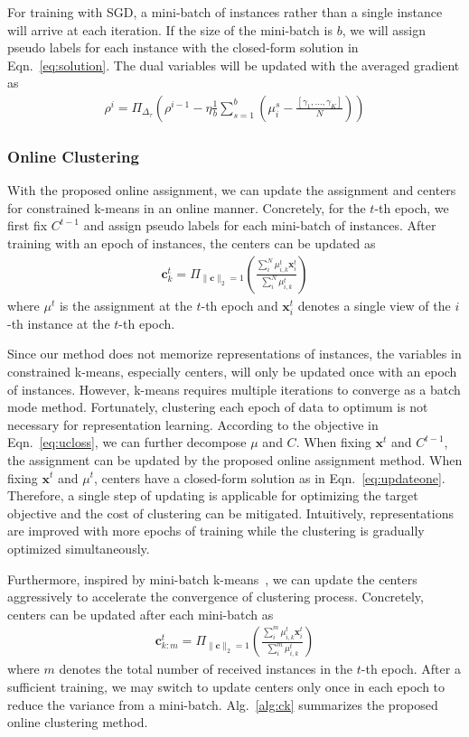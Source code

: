 \documentclass[10pt,twocolumn,letterpaper]{article}
\def \x {\mathbf{x}}
\def \cc {\mathbf{c}}
\begin{document}
For training with SGD, a mini-batch of instances rather than a single instance will arrive at each iteration. If the size of the mini-batch is $b$, we will assign pseudo labels for each instance with the closed-form solution in Eqn.~\ref{eq:solution}. The dual variables will be updated with the averaged gradient as
\begin{eqnarray}\label{eq:update}
\rho^i = \Pi_{\Delta_\tau}(\rho^{i-1} - \eta \frac{1}{b}\sum_{s=1}^b( \mu_{i}^s-\frac{[\gamma_1,\dots,\gamma_K]}{N}))
\end{eqnarray}

\subsubsection{Online Clustering}
With the proposed online assignment, we can update the assignment and centers for constrained k-means in an online manner. Concretely, for the $t$-th epoch, we first fix $C^{t-1}$ and assign pseudo labels for each mini-batch of instances. After training with an epoch of instances, the centers can be updated as
\begin{eqnarray}\label{eq:updateone}
\cc_k^t = \Pi_{\|\cc\|_2=1}(\frac{\sum_i^N\mu_{i,k}^t\x_i^t}{\sum_i^N \mu_{i,k}^t})
\end{eqnarray}
where $\mu^t$ is the assignment at the $t$-th epoch and $\x_i^t$ denotes a single view of the $i$-th instance at the $t$-th epoch.

Since our method does not memorize representations of instances, the variables in constrained k-means, especially centers, will only be updated once with an epoch of instances. However, k-means requires multiple iterations to converge as a batch mode method. Fortunately, clustering each epoch of data to optimum is not necessary for representation learning. According to the objective in Eqn.~\ref{eq:ucloss}, we can further decompose $\mu$ and $C$. When fixing $\x^t$ and $C^{t-1}$, the assignment can be updated by the proposed online assignment method. When fixing $\x^t$ and $\mu^t$, centers have a closed-form solution as in Eqn.~\ref{eq:updateone}. Therefore, a single step of updating is applicable for optimizing the target objective and the cost of clustering can be mitigated. Intuitively, representations are improved with more epochs of training while the clustering is gradually optimized simultaneously.

Furthermore, inspired by mini-batch k-means~\cite{Sculley10}, we can update the centers aggressively to accelerate the convergence of clustering process. Concretely, centers can be updated after each mini-batch as
\begin{eqnarray}\label{eq:updatemulti}
\cc_{k:m}^t = \Pi_{\|\cc\|_2=1}(\frac{\sum_i^m\mu_{i,k}^t\x_i^t}{\sum_i^m \mu_{i,k}^t})
\end{eqnarray}
where $m$ denotes the total number of received instances in the $t$-th epoch. After a sufficient training, we may switch to update centers only once in each epoch to reduce the variance from a mini-batch. Alg.~\ref{alg:ck} summarizes the proposed online clustering method.
\end{document}
